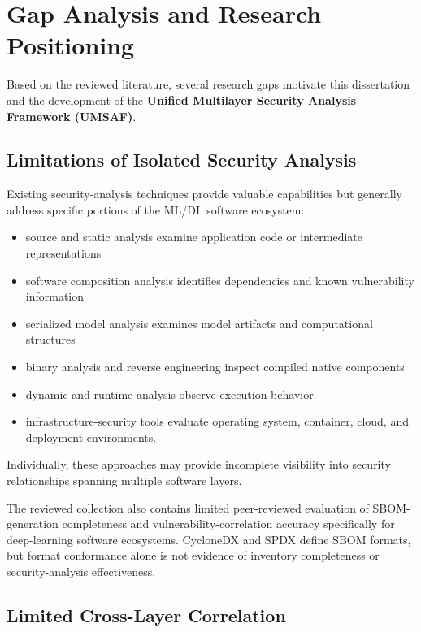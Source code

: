\documentclass[
  12pt,
  letterpaper,
  oneside]{report}
\providecommand{\tightlist}{%
  \setlength{\itemsep}{0pt}\setlength{\parskip}{0pt}}
\begin{document}
\section{Gap Analysis and Research Positioning}\label{89-gap-analysis-and-research-positioning}

Based on the reviewed literature, several research gaps motivate this
dissertation and the development of the \textbf{Unified Multilayer
Security Analysis Framework (UMSAF)}.

\subsection{Limitations of Isolated Security Analysis}\label{1-limitations-of-isolated-security-analysis}

Existing security-analysis techniques provide valuable capabilities but
generally address specific portions of the ML/DL software ecosystem:

\begin{itemize}
\tightlist
\item
  source and static analysis examine application code or intermediate
  representations
\item
  software composition analysis identifies dependencies and known
  vulnerability information
\item
  serialized model analysis examines model artifacts and computational
  structures
\item
  binary analysis and reverse engineering inspect compiled native
  components
\item
  dynamic and runtime analysis observe execution behavior
\item
  infrastructure-security tools evaluate operating system, container,
  cloud, and deployment environments.
\end{itemize}

Individually, these approaches may provide incomplete visibility into
security relationships spanning multiple software layers.

The reviewed collection also contains limited peer-reviewed evaluation
of SBOM-generation completeness and vulnerability-correlation accuracy
specifically for deep-learning software ecosystems. CycloneDX and SPDX
define SBOM formats, but format conformance alone is not evidence of
inventory completeness or security-analysis effectiveness.
\cite{cyclonedxSpecification,spdxSpecification}

\subsection{Limited Cross-Layer Correlation}\label{2-limited-cross-layer-correlation}
\end{document}
